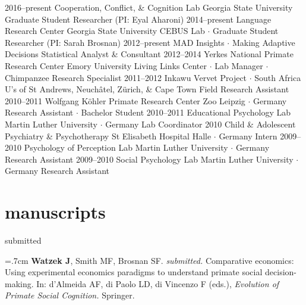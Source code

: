 \documentclass[]{friggeri-cv}
\begin{document}
\begin{entrylist}
  \entry
    {2016--present}
    {Cooperation, Conflict, \& Cognition Lab}
    {Georgia State University}
    {Graduate Student Researcher (PI: Eyal Aharoni)}
  \entry
    {2014--present}
    {Language Research Center}
    {Georgia State University}
    {CEBUS Lab $\cdot$ Graduate Student Researcher (PI: Sarah Brosnan)}
  \entry
    {2012--present}
    {MAD Insights $\cdot$ Making Adaptive Decisions}
    {}
    {Statistical Analyst \& Consultant}
  \entry
    {2012--2014}
    {Yerkes National Primate Research Center}
    {Emory University}
    {Living Links Center $\cdot$ Lab Manager $\cdot$ Chimpanzee Research Specialist}
  \entry
    {2011--2012}
    {Inkawu Vervet Project $\cdot$ South Africa}
    {U's of St Andrews, Neuch\^{a}tel, Z\"urich, \& Cape Town}
    {Field Research Assistant}
  \entry
    {2010--2011}
    {Wolfgang K\"{o}hler Primate Research Center}
    {Zoo Leipzig $\cdot$ Germany}
    {Research Assistant $\cdot$ Bachelor Student}
  \entry
    {2010--2011}
    {Educational Psychology Lab}
    {Martin Luther University $\cdot$ Germany}
    {Lab Coordinator}
  \entry
    {2010}
    {Child \& Adolescent Psychiatry \& Psychotherapy}
    {St Elisabeth Hospital Halle $\cdot$ Germany}
    {Intern}
  \entry
    {2009--2010}
    {Psychology of Perception Lab}
    {Martin Luther University $\cdot$ Germany}
    {Research Assistant}
  \entry
    {2009--2010}
    {Social Psychology Lab}
    {Martin Luther University $\cdot$ Germany}
    {Research Assistant}
\end{entrylist}


\newpage
\thispagestyle{fancy}

\section{manuscripts}

{\large{} submitted}

\hangindent=.7cm \textbf{Watzek J}, Smith MF, Brosnan SF. \emph{submitted.} Comparative economics: Using experimental economics paradigms to understand primate social decision-making. In: d'Almeida AF, di Paolo LD, di Vincenzo F (eds.), \emph{Evolution of Primate Social Cognition.} Springer.
\end{document}
